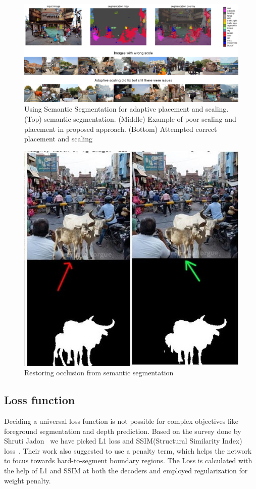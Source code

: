 \documentclass[review]{cvpr}
\begin{document}
\begin{figure}
  \begin{center}
  \includegraphics[width=1.0\textwidth]{refinement.png}
  \end{center}
  \caption{Using Semantic Segmentation for adaptive placement and scaling. (Top) semantic segmentation. (Middle) Example of poor scaling and placement in proposed approach. (Bottom) Attempted correct placement and scaling}
  \label{fig:refinement}
\end{figure}

\begin{figure}[h!]
  \begin{center}
  \includegraphics[width=0.8\linewidth]{occlusion.jpg}
  \end{center}
  \caption{Restoring occlusion from semantic segmentation}
  \label{fig:occlusion}
\end{figure}

\subsection{Loss function}
Deciding a universal loss function is not possible for complex objectives like foreground segmentation and depth prediction. Based on the survey done by Shruti Jadon~\cite{jadon2020survey} we have picked L1 loss and SSIM(Structural Similarity Index) loss~\cite{zhao2015loss}. Their work also suggested to use a penalty term, which helps the network to focus towards hard-to-segment boundary regions. The Loss is calculated with the help of L1 and SSIM at both the decoders and employed regularization for weight penalty.
\end{document}
